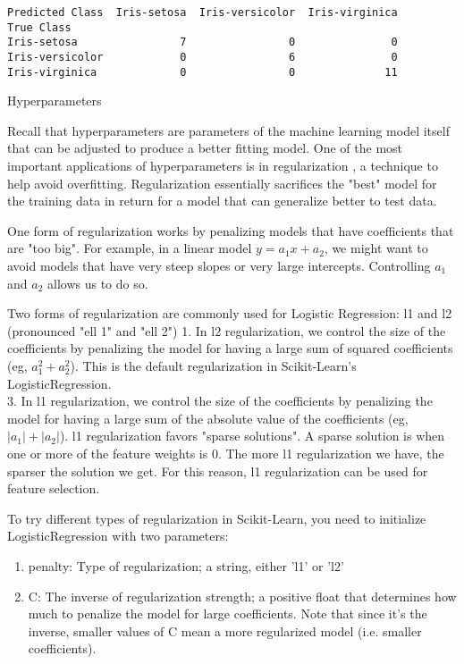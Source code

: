 \documentclass[8pt]{extarticle}
\providecommand{\tightlist}{%
      \setlength{\itemsep}{0pt}\setlength{\parskip}{0pt}}
\begin{document}
    \begin{Verbatim}[commandchars=\\\{\}]
Predicted Class  Iris-setosa  Iris-versicolor  Iris-virginica
True Class                                                   
Iris-setosa                7                0               0
Iris-versicolor            0                6               0
Iris-virginica             0                0              11

    \end{Verbatim}

    Hyperparameters

Recall that hyperparameters are parameters of the machine learning model
itself that can be adjusted to produce a better fitting model. One of
the most important applications of hyperparameters is in regularization
, a technique to help avoid overfitting. Regularization essentially
sacrifices the "best" model for the training data in return for a model
that can generalize better to test data.

One form of regularization works by penalizing models that have
coefficients that are "too big". For example, in a linear model
\(y = a_1 x + a_2\), we might want to avoid models that have very steep
slopes or very large intercepts. Controlling \(a_1\) and \(a_2\) allows
us to do so.

Two forms of regularization are commonly used for Logistic Regression:
l1 and l2 (pronounced "ell 1" and "ell 2") 1. In l2 regularization, we
control the size of the coefficients by penalizing the model for having
a large sum of squared coefficients (eg, \(a_1^2 + a_2^2\)). This is the
default regularization in Scikit-Learn's LogisticRegression.\\
3. In l1 regularization, we control the size of the coefficients by
penalizing the model for having a large sum of the absolute value of the
coefficients (eg, \(|a_1| + |a_2|\)). l1 regularization favors "sparse
solutions". A sparse solution is when one or more of the feature weights
is 0. The more l1 regularization we have, the sparser the solution we
get. For this reason, l1 regularization can be used for feature
selection.

To try different types of regularization in Scikit-Learn, you need to
initialize LogisticRegression with two parameters:

\begin{enumerate}
\def\labelenumi{\arabic{enumi}.}
\tightlist
\item
  penalty: Type of regularization; a string, either 'l1' or 'l2'
\item
  C: The inverse of regularization strength; a positive float that
  determines how much to penalize the model for large coefficients. Note
  that since it's the inverse, smaller values of C mean a more
  regularized model (i.e. smaller coefficients).
\end{enumerate}
\end{document}
